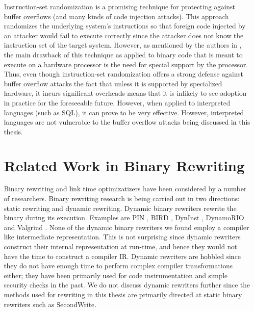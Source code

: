 Instruction-set randomization \cite{} is a promising technique for protecting against buffer
overflows (and many kinds of code injection attacks). This approach randomizes the underlying
system's instructions so that foreign code injected by an attacker would fail to execute correctly
since the attacker does not know the instruction set of the target system. However, as mentioned by
the authors in \cite{}, the main drawback of this technique as applied to binary code that is meant
to execute on a hardware processor is the need for special support by the processor. Thus, even
though instruction-set randomization offers a strong defense against buffer overflow attacks the
fact that unless it is supported by specialized hardware, it incurs significant overheads means that
it is inlikely to see adoption in practice for the foreseeable future. However, when applied to
interpreted languages (such as SQL), it can prove to be very effective. However, interpreted
languages are not vulnerable to the buffer overflow attacks being discussed in this thesis.

\section{Related Work in Binary Rewriting}

Binary rewriting and link time optimizatizers have been considered by a number of researchers.
Binary rewriting research is being carried out in two directions: static rewriting and dynamic
rewriting. Dynamic binary rewriters rewrite the binary during its execution. Examples are PIN
\cite{pin}, BIRD \cite{bird}, DynInst \cite{dyninst}, DynamoRIO \cite{drio} and Valgrind \cite{valg}. None of the dynamic
binary rewriters we found employ a compiler like intermediate representation. This is not surprising
since dynamic rewriters construct their internal representation at run-time, and hence they would
not have the time to construct a compiler IR. Dynamic rewriters are hobbled since they do not have
enough time to perform complex compiler transformations either; they have been primarily used for
code instrumentation and simple security checks in the past. We do not discuss dynamic rewriters
further since the methods used for rewriting in this thesis are primarily directed at static binary
rewriters such as SecondWrite.

